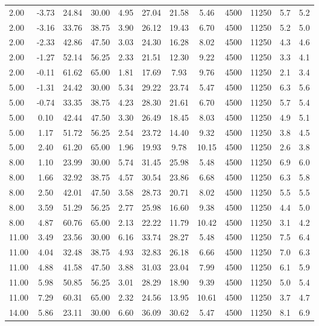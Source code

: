\documentclass[english]{SPFShortReport}
\begin{document}
\begin{table}[!ht]
\begin{small}
\begin{center}
{\begin{tabular}{l | c c c c c c c c c c c }
2.00 & -3.73 & 24.84 & 30.00 & 4.95 & 27.04 & 21.58 & 5.46 & 4500 & 11250 & 5.7 & 5.2\\ 
2.00 & -3.16 & 33.76 & 38.75 & 3.90 & 26.12 & 19.43 & 6.70 & 4500 & 11250 & 5.2 & 5.0\\ 
2.00 & -2.33 & 42.86 & 47.50 & 3.03 & 24.30 & 16.28 & 8.02 & 4500 & 11250 & 4.3 & 4.6\\ 
2.00 & -1.27 & 52.14 & 56.25 & 2.33 & 21.51 & 12.30 & 9.22 & 4500 & 11250 & 3.3 & 4.1\\ 
2.00 & -0.11 & 61.62 & 65.00 & 1.81 & 17.69 & 7.93 & 9.76 & 4500 & 11250 & 2.1 & 3.4\\ 
5.00 & -1.31 & 24.42 & 30.00 & 5.34 & 29.22 & 23.74 & 5.47 & 4500 & 11250 & 6.3 & 5.6\\ 
5.00 & -0.74 & 33.35 & 38.75 & 4.23 & 28.30 & 21.61 & 6.70 & 4500 & 11250 & 5.7 & 5.4\\ 
5.00 & 0.10 & 42.44 & 47.50 & 3.30 & 26.49 & 18.45 & 8.03 & 4500 & 11250 & 4.9 & 5.1\\ 
5.00 & 1.17 & 51.72 & 56.25 & 2.54 & 23.72 & 14.40 & 9.32 & 4500 & 11250 & 3.8 & 4.5\\ 
5.00 & 2.40 & 61.20 & 65.00 & 1.96 & 19.93 & 9.78 & 10.15 & 4500 & 11250 & 2.6 & 3.8\\ 
8.00 & 1.10 & 23.99 & 30.00 & 5.74 & 31.45 & 25.98 & 5.48 & 4500 & 11250 & 6.9 & 6.0\\ 
8.00 & 1.66 & 32.92 & 38.75 & 4.57 & 30.54 & 23.86 & 6.68 & 4500 & 11250 & 6.3 & 5.8\\ 
8.00 & 2.50 & 42.01 & 47.50 & 3.58 & 28.73 & 20.71 & 8.02 & 4500 & 11250 & 5.5 & 5.5\\ 
8.00 & 3.59 & 51.29 & 56.25 & 2.77 & 25.98 & 16.60 & 9.38 & 4500 & 11250 & 4.4 & 5.0\\ 
8.00 & 4.87 & 60.76 & 65.00 & 2.13 & 22.22 & 11.79 & 10.42 & 4500 & 11250 & 3.1 & 4.2\\ 
11.00 & 3.49 & 23.56 & 30.00 & 6.16 & 33.74 & 28.27 & 5.48 & 4500 & 11250 & 7.5 & 6.4\\ 
11.00 & 4.04 & 32.48 & 38.75 & 4.93 & 32.83 & 26.18 & 6.66 & 4500 & 11250 & 7.0 & 6.3\\ 
11.00 & 4.88 & 41.58 & 47.50 & 3.88 & 31.03 & 23.04 & 7.99 & 4500 & 11250 & 6.1 & 5.9\\ 
11.00 & 5.98 & 50.85 & 56.25 & 3.01 & 28.29 & 18.90 & 9.39 & 4500 & 11250 & 5.0 & 5.4\\ 
11.00 & 7.29 & 60.31 & 65.00 & 2.32 & 24.56 & 13.95 & 10.61 & 4500 & 11250 & 3.7 & 4.7\\ 
14.00 & 5.86 & 23.11 & 30.00 & 6.60 & 36.09 & 30.62 & 5.47 & 4500 & 11250 & 8.1 & 6.9\\ 

\end{tabular}}
\end{center}
\end{small}
\end{table}
\end{document}
